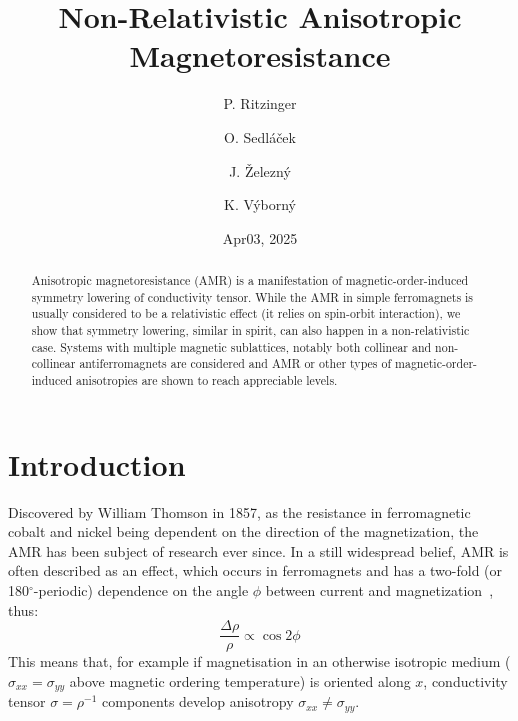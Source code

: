 \documentclass[prb,showpacs,amsmath,amssymb,superscriptaddress,twocolumn,floatfix]{revtex4-1}
\begin{document}
\title{Non-Relativistic Anisotropic Magnetoresistance}

\author{P. Ritzinger}

\author{O. Sedl\'a\v cek}
\author{J. \v Zelezn\'y}

\author{K. V\'yborn\'y}


\date{Apr03, 2025}

\begin{abstract}
Anisotropic magnetoresistance (AMR) is a manifestation of
magnetic-order-induced symmetry lowering of conductivity tensor.
While the AMR in simple ferromagnets is usually considered to be a
relativistic effect (it relies on spin-orbit interaction), we show
that symmetry lowering, similar in spirit, can also happen in a
non-relativistic case. Systems with multiple magnetic sublattices,
notably both collinear and non-collinear antiferromagnets are considered
and AMR or other types of magnetic-order-induced anisotropies are shown
to reach appreciable levels.
\end{abstract}


\maketitle

\section{Introduction}

Discovered by William Thomson in 1857,\cite{Thomson:1857} as the
resistance in ferromagnetic cobalt and nickel being dependent on the
direction of the magnetization, the AMR has been subject of research
ever since.\cite{Ritzinger:2023} In a still widespread belief, AMR is
often described as an effect, which occurs in ferromagnets and has a
two-fold (or 180$^\circ$-periodic) dependence on the angle $\phi$ between current and magnetization~\cite{Alagoz:2015}, thus:
%
\begin{equation}
	\frac{\Delta \rho}{\rho} \propto \cos 2 \phi
	\label{eq_ncollAMR}
\end{equation}
%
This means that, for example if magnetisation in an otherwise
isotropic medium ($\sigma_{xx}=\sigma_{yy}$ above magnetic ordering
temperature) is oriented along $x$, conductivity tensor
$\sigma=\rho^{-1}$ components develop anisotropy $\sigma_{xx}\not=\sigma_{yy}$.
\end{document}
